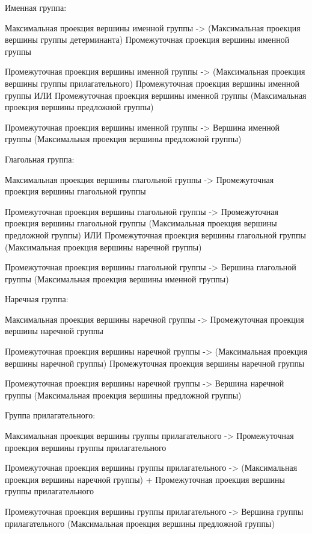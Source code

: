 Именная группа:
\begin{textitemize}
    \item Максимальная проекция вершины именной группы -> (Максимальная проекция вершины группы детерминанта) Промежуточная проекция вершины именной группы
    \item Промежуточная проекция вершины именной группы -> (Максимальная проекция вершины группы прилагательного) Промежуточная проекция вершины именной группы ИЛИ Промежуточная проекция вершины именной группы (Максимальная проекция вершины предложной группы)
    \item Промежуточная проекция вершины именной группы -> Вершина именной группы (Максимальная проекция вершины предложной группы)
\end{textitemize}

Глагольная группа:
\begin{textitemize}
    \item Максимальная проекция вершины глагольной группы -> Промежуточная проекция вершины глагольной группы
    \item Промежуточная проекция вершины глагольной группы -> Промежуточная проекция вершины глагольной группы (Максимальная проекция вершины предложной группы) ИЛИ Промежуточная проекция вершины глагольной группы (Максимальная проекция вершины наречной группы)
    \item Промежуточная проекция вершины глагольной группы -> Вершина глагольной группы (Максимальная проекция вершины именной группы)
\end{textitemize}

Наречная группа:
\begin{textitemize}
    \item Максимальная проекция вершины наречной группы -> Промежуточная проекция вершины наречной группы
    \item Промежуточная проекция вершины наречной группы -> (Максимальная проекция вершины наречной группы) Промежуточная проекция вершины наречной группы
    \item Промежуточная проекция вершины наречной группы -> Вершина наречной группы (Максимальная проекция вершины предложной группы)
\end{textitemize}

Группа прилагательного:
\begin{textitemize}
    \item Максимальная проекция вершины группы прилагательного -> Промежуточная проекция вершины группы прилагательного
    \item Промежуточная проекция вершины группы прилагательного -> (Максимальная проекция вершины наречной группы) + Промежуточная проекция вершины группы прилагательного
    \item Промежуточная проекция вершины группы прилагательного -> Вершина группы прилагательного (Максимальная проекция вершины предложной группы)
\end{textitemize}


